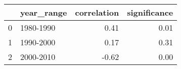 \begin{tabular}{llrr}
\toprule
{} & year\_range &  correlation &  significance \\
\midrule
0 &  1980-1990 &         0.41 &          0.01 \\
1 &  1990-2000 &         0.17 &          0.31 \\
2 &  2000-2010 &        -0.62 &          0.00 \\
\bottomrule
\end{tabular}
